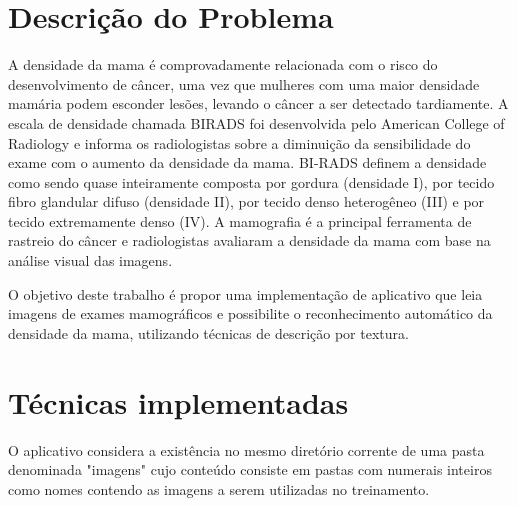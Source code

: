 \tableofcontents
\newpage


\section{\esp Descrição do Problema}
A densidade da mama é comprovadamente relacionada com o risco do desenvolvimento de câncer, uma vez que mulheres com uma maior densidade mamária podem esconder lesões, levando o câncer a ser detectado tardiamente. A escala de densidade chamada BIRADS foi desenvolvida pelo American College of Radiology e informa os radiologistas sobre a diminuição da sensibilidade do exame com o aumento da densidade da mama. BI-RADS definem a densidade como sendo quase inteiramente composta por gordura (densidade I), por tecido fibro glandular difuso (densidade II), por tecido denso heterogêneo (III) e por tecido extremamente denso (IV). A mamografia é a principal ferramenta de rastreio do câncer e radiologistas avaliaram a densidade da mama com base na análise visual das imagens.

O objetivo deste trabalho é propor uma implementação de aplicativo que leia imagens de exames mamográficos e possibilite o reconhecimento automático da densidade da mama, utilizando técnicas de descrição por textura.

\section{\esp Técnicas implementadas}

O aplicativo considera a existência no mesmo diretório corrente de uma pasta denominada "imagens" cujo conteúdo consiste em pastas com numerais inteiros como nomes contendo as imagens a serem utilizadas no treinamento.

